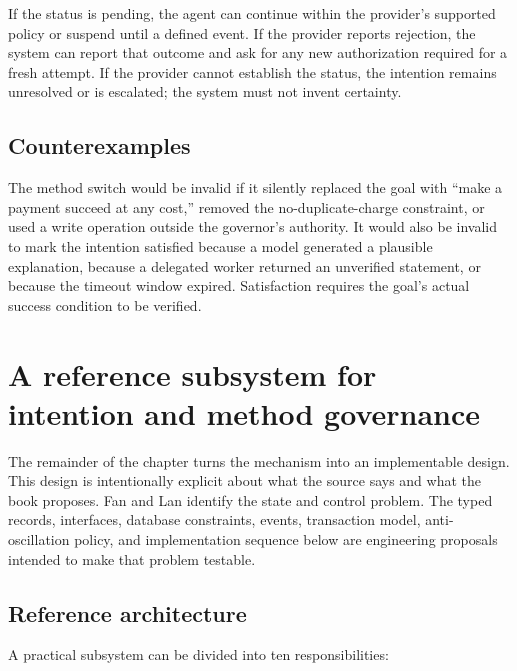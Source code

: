 If the status is pending, the agent can continue within the provider's supported policy or suspend until a defined event. If the provider reports rejection, the system can report that outcome and ask for any new authorization required for a fresh attempt. If the provider cannot establish the status, the intention remains unresolved or is escalated; the system must not invent certainty.

\subsection{Counterexamples}

The method switch would be invalid if it silently replaced the goal with ``make a payment succeed at any cost,'' removed the no-duplicate-charge constraint, or used a write operation outside the governor's authority. It would also be invalid to mark the intention satisfied because a model generated a plausible explanation, because a delegated worker returned an unverified statement, or because the timeout window expired. Satisfaction requires the goal's actual success condition to be verified.

\section{A reference subsystem for intention and method governance}
\label{sec:ch15-reference-design}

The remainder of the chapter turns the mechanism into an implementable design. This design is intentionally explicit about what the source says and what the book proposes. Fan and Lan identify the state and control problem. The typed records, interfaces, database constraints, events, transaction model, anti-oscillation policy, and implementation sequence below are engineering proposals intended to make that problem testable.

\subsection{Reference architecture}

A practical subsystem can be divided into ten responsibilities:

